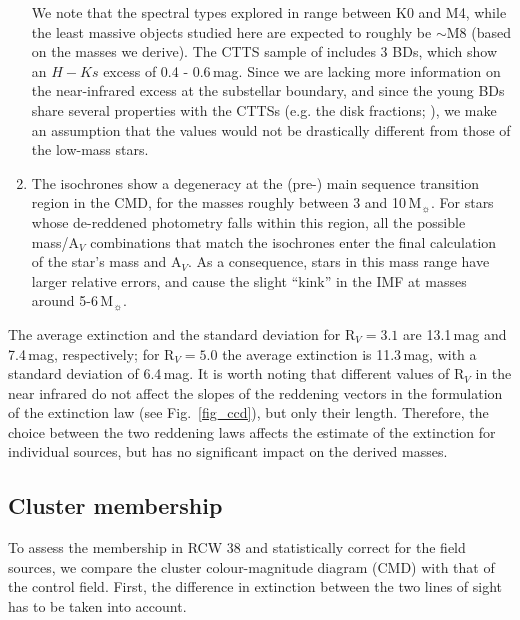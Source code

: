 \documentclass[a4paper,fleqn,usenatbib]{mnras}
\begin{document}
\begin{enumerate}
We note that the spectral types explored in \citet{cieza05} range between K0 and M4, while the least massive objects
studied here are expected to roughly be $\sim$M8 (based on the masses we derive). The CTTS sample of \citet{downes08} includes 3 BDs, which
show an $H-Ks$ excess of 0.4 - 0.6\,mag. Since we are lacking more information on the near-infrared excess at the substellar boundary, and
since the young BDs share several properties with the CTTSs (e.g. the disk fractions; \citealt{dawson13}),
we make an assumption that the 
values would not be drastically different from those of the low-mass stars. 

 
\item
The isochrones show a degeneracy at the (pre-) main sequence transition region in the CMD, for the masses roughly between 3 and 10\,M$_{\sun}$.
For stars whose de-reddened photometry falls within this region, all the possible mass/A$_V$ combinations that match the isochrones enter the final
calculation of the star's mass and A$_V$. As a consequence, stars in this mass range have larger relative errors, and cause the 
slight ``kink'' in the IMF at masses around 5-6\,M$_{\sun}$.
 
  
\end{enumerate}  

The average extinction and the standard deviation for R$_V=3.1$ are 13.1\,mag and 7.4\,mag, respectively; 
for R$_V=5.0$ the average extinction is 11.3\,mag, with a standard deviation of 6.4\,mag. 
It is worth noting that different values of R$_V$ in the near infrared do not affect the slopes of the reddening vectors in the \citet{cardelli89} formulation of the extinction law (see Fig.~\ref{fig_ccd}), but only
their length. Therefore, the choice between the two reddening laws affects the estimate of the extinction for individual sources, but has no significant impact on the derived masses.


\subsection{Cluster membership}
To assess the membership in RCW 38 and statistically correct for the field sources, we
compare the cluster colour-magnitude diagram (CMD) with that of the control field. First, the difference in extinction
between the two lines of sight has to be taken into account. 
\end{document}
